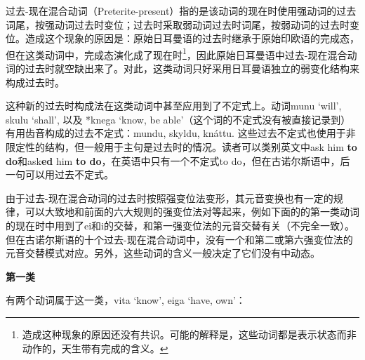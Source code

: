 过去-现在混合动词（Preterite-present）指的是该动词的现在时使用强动词的过去词尾，按强动词过去时变位；过去时采取弱动词过去时词尾，按弱动词的过去时变位。造成这个现象的原因是：原始日耳曼语的过去时继承于原始印欧语的完成态，但在这类动词中，完成态演化成了现在时\footnote{造成这种现象的原因还没有共识。可能的解释是，这些动词都是表示状态而非动作的，天生带有完成的含义。}，因此原始日耳曼语中过去-现在混合动词的过去时就空缺出来了。对此，这类动词只好采用日耳曼语独立的弱变化结构来构成过去时。

这种新的过去时构成法在这类动词中甚至应用到了不定式上。动词munu `will‌',
skulu `shall‌', 以及 *knega `know, be
able‌'（这个词的不定式没有被直接记录到）有用齿音构成的过去不定式：mundu,
skyldu, knáttu.
这些过去不定式也使用于非限定性的结构，但一般用于主句是过去时的情况。读者可以类别英文中ask
him \textbf{to do}和ask\textbf{ed} him \textbf{to
do}，在英语中只有一个不定式to
do，但在古诺尔斯语中，后一句可以用过去不定式。

由于过去-现在混合动词的过去时按照强变位法变形，其元音变换也有一定的规律，可以大致地和前面的六大规则的强变位法对等起来，例如下面的的第一类动词的现在时中用到了ei和i的交替，和第一强变位法的元音交替有关（不完全一致）。但在古诺尔斯语的十个过去-现在混合动词中，没有一个和第二或第六强变位法的元音交替模式对应。另外，这些动词的含义一般决定了它们没有中动态。

\textbf{第一类}

有两个动词属于这一类，vita `know‌', eiga `have, own‌'：

